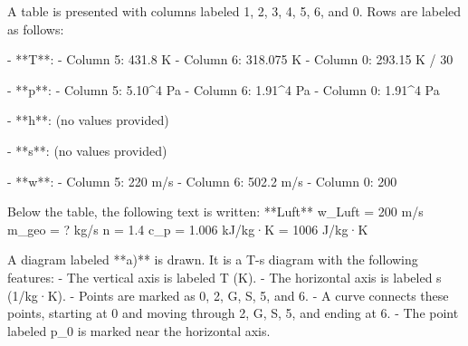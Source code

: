 A table is presented with columns labeled 1, 2, 3, 4, 5, 6, and 0. Rows are labeled as follows:  

- **T**:  
  - Column 5: 431.8 K  
  - Column 6: 318.075 K  
  - Column 0: 293.15 K / 30  

- **p**:  
  - Column 5: 5.10^4 Pa  
  - Column 6: 1.91^4 Pa  
  - Column 0: 1.91^4 Pa  

- **h**: (no values provided)  

- **s**: (no values provided)  

- **w**:  
  - Column 5: 220 m/s  
  - Column 6: 502.2 m/s  
  - Column 0: 200  

Below the table, the following text is written:  
**Luft**  
w_Luft = 200 m/s  
m_geo = ? kg/s  
n = 1.4  
c_p = 1.006 kJ/kg·K = 1006 J/kg·K  

A diagram labeled **a)** is drawn. It is a T-s diagram with the following features:  
- The vertical axis is labeled T (K).  
- The horizontal axis is labeled s (1/kg·K).  
- Points are marked as 0, 2, G, S, 5, and 6.  
- A curve connects these points, starting at 0 and moving through 2, G, S, 5, and ending at 6.  
- The point labeled p_0 is marked near the horizontal axis.